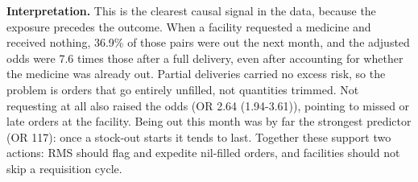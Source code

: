 \documentclass[10pt,a4paper]{article}
\begin{document}
\textbf{Interpretation.} This is the clearest causal signal in the data, because the exposure precedes the outcome. When a facility requested a medicine and received nothing, 36.9\% of those pairs were out the next month, and the adjusted odds were 7.6 times those after a full delivery, even after accounting for whether the medicine was already out. Partial deliveries carried no excess risk, so the problem is orders that go entirely unfilled, not quantities trimmed. Not requesting at all also raised the odds (OR 2.64 (1.94-3.61)), pointing to missed or late orders at the facility. Being out this month was by far the strongest predictor (OR 117): once a stock-out starts it tends to last. Together these support two actions: RMS should flag and expedite nil-filled orders, and facilities should not skip a requisition cycle.
\end{document}
